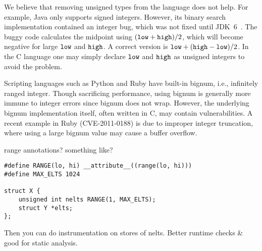 We believe that removing unsigned types from the language does not
help.  For example, Java only supports signed integers.  However,
its binary search implementation contained an integer bug, which
was not fixed until JDK~6~\cite{java-bsearch}.  The buggy code
calculates the midpoint using $(\texttt{low} + \texttt{high})/2$, which
will become negative for large $\texttt{low}$ and $\texttt{high}$.  A correct
version is $\texttt{low} + (\texttt{high}-\texttt{low})/2$.  In the C language
one may simply declare $\texttt{low}$ and $\texttt{high}$ as unsigned
integers to avoid the problem.

Scripting languages such as Python and Ruby have built-in bignum,
i.e., infinitely ranged integer.  Though sacrificing performance,
using bignum is generally more immune to integer errors since bignum
does not wrap.
%
However, the underlying bignum implementation itself, often written
in C, may contain vulnerabilities.  A recent example in Ruby
(CVE-2011-0188) is due to improper integer truncation, where using
a large bignum value may cause a buffer overflow.
%

range annotations?  something like?
\begin{Verbatim}
#define RANGE(lo, hi) __attribute__((range(lo, hi)))
#define MAX_ELTS 1024

struct X {
	unsigned int nelts RANGE(1, MAX_ELTS);
	struct Y *elts;
};
\end{Verbatim}
Then you can do instrumentation on stores of nelts.
Better runtime checks \& good for static analysis.
\fi
